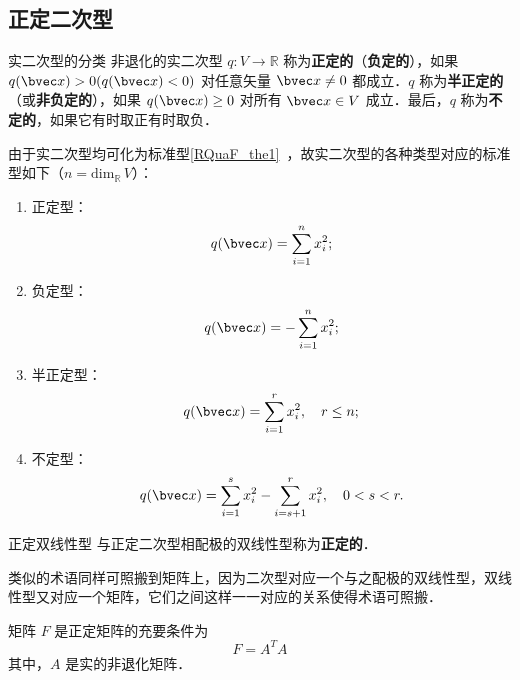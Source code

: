 
\begin{issues}
\end{issues}

\subsection{正定二次型}
\begin{definition}{实二次型的分类}
非退化的实二次型 $q:V\rightarrow\mathbb R$ 称为\textbf{正定的}（\textbf{负定的}），如果 $q(\bvec x)>0(q(\bvec x)<0)$ 对任意矢量 $\bvec x\neq0$ 都成立．$q$ 称为\textbf{半正定的}（或\textbf{非负定的}），如果 $q(\bvec x)\geq0$ 对所有 $\bvec x\in V$ 成立．最后，$q$ 称为\textbf{不定的}，如果它有时取正有时取负．
\end{definition}
由于实二次型均可化为标准型\autoref{RQuaF_the1}~，故实二次型的各种类型对应的标准型如下（$n=\mathrm{dim}_\mathbb R \,V$）：
\begin{enumerate}
\item 正定型：\begin{equation}\label{DeQua_eq1}
q(\bvec x)=\sum_{i=1}^n x_i^2;
\end{equation}
\item 负定型：\begin{equation}
q(\bvec x)=-\sum_{i=1}^n x_i^2;
\end{equation}
\item 半正定型：\begin{equation}
q(\bvec x)=\sum_{i=1}^r x_i^2,\quad r\leq n;
\end{equation}
\item 不定型：\begin{equation}
q(\bvec x)=\sum_{i=1}^s x_i^2-\sum_{i=s+1}^r x_i^2,\quad0<s< r.
\end{equation}
\end{enumerate}
\begin{definition}{正定双线性型}\label{DeQua_def1}
与正定二次型相配极的双线性型称为\textbf{正定的}．
\end{definition}
类似的术语同样可照搬到矩阵上，因为二次型对应一个与之配极的双线性型，双线性型又对应一个矩阵，它们之间这样一一对应的关系使得术语可照搬．
\begin{theorem}{}
矩阵 $F$ 是正定矩阵的充要条件为
\begin{equation}
F=A^TA
\end{equation}
其中，$A$ 是实的非退化矩阵．
\end{theorem}

